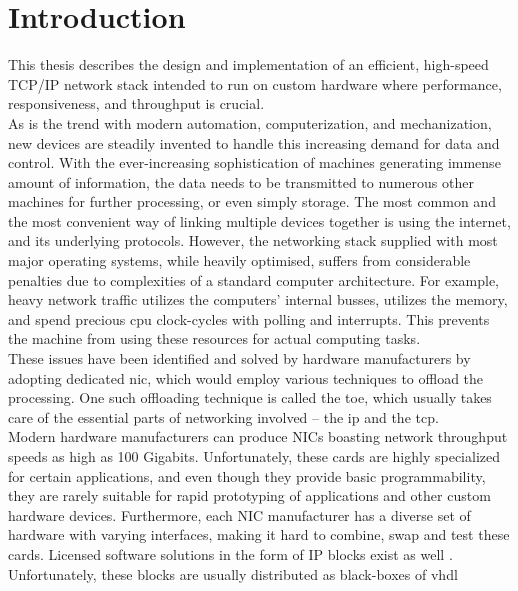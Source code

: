 \chapter{Introduction}
This thesis describes the design and implementation of an efficient, high-speed
TCP/IP network stack intended to run on custom hardware where performance, responsiveness,
and throughput is crucial.\\

As is the trend with modern automation, computerization, and mechanization, new
devices are steadily invented to handle this increasing demand for data and
control.
With the ever-increasing sophistication of machines generating immense amount
of information, the data needs to be transmitted to numerous other machines for
further processing, or even simply storage. The most common and the most convenient
way of linking multiple devices together is using the internet, and its underlying
protocols. However, the networking stack supplied with most major operating
systems, while heavily optimised, suffers from considerable penalties due to
complexities of a standard computer architecture. For example, heavy network
traffic utilizes the computers' internal busses, utilizes the memory, and spend
precious \gls{cpu} clock-cycles with polling and interrupts. This
prevents the machine from using these resources for actual computing tasks.\\
These issues have been identified and solved by hardware manufacturers by
adopting dedicated \gls{nic}, which would employ
various techniques to offload the processing. One such offloading technique is
called the \gls{toe}, which usually takes care of the essential
parts of networking involved -- the \gls{ip} and the \gls{tcp}\cite{TCP_offload_dumb_idea}.\\
Modern hardware manufacturers can produce NICs boasting network throughput
speeds as high as 100 Gigabits\cite{xilinx_100g_nic}. Unfortunately, these cards
are highly specialized for certain applications, and even though they provide
basic programmability, they are rarely suitable for rapid prototyping of
applications and other custom hardware devices. Furthermore, each NIC manufacturer
has a diverse set of hardware with varying interfaces, making it hard to
combine, swap and test these cards.
Licensed software solutions in the form of IP blocks exist as well
\cite{microtronix_ip_cores}\cite{avnet_ip_cores}. Unfortunately,
these blocks are usually distributed as black-boxes of \gls{vhdl}
